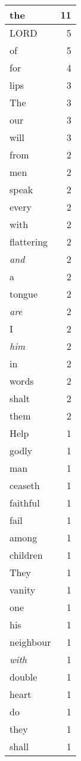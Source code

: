 \begin{center}
\begin{longtable}{l|r}
\hline \hline
\endlastfoot
the & 11 \\ \hline
LORD & 5 \\ \hline
of & 5 \\ \hline
for & 4 \\ \hline
lips & 3 \\ \hline
The & 3 \\ \hline
our & 3 \\ \hline
will & 3 \\ \hline
from & 2 \\ \hline
men & 2 \\ \hline
speak & 2 \\ \hline
every & 2 \\ \hline
with & 2 \\ \hline
flattering & 2 \\ \hline
\emph{and} & 2 \\ \hline
a & 2 \\ \hline
tongue & 2 \\ \hline
\emph{are} & 2 \\ \hline
I & 2 \\ \hline
\emph{him} & 2 \\ \hline
in & 2 \\ \hline
words & 2 \\ \hline
shalt & 2 \\ \hline
them & 2 \\ \hline
Help & 1 \\ \hline
godly & 1 \\ \hline
man & 1 \\ \hline
ceaseth & 1 \\ \hline
faithful & 1 \\ \hline
fail & 1 \\ \hline
among & 1 \\ \hline
children & 1 \\ \hline
They & 1 \\ \hline
vanity & 1 \\ \hline
one & 1 \\ \hline
his & 1 \\ \hline
neighbour & 1 \\ \hline
\emph{with} & 1 \\ \hline
double & 1 \\ \hline
heart & 1 \\ \hline
do & 1 \\ \hline
they & 1 \\ \hline
shall & 1 \\ \hline

\end{longtable}
\end{center}
